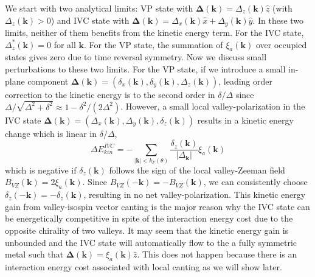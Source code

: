 \documentclass[aps,pra,twocolumn,superscriptaddress,10pt,article,nofootinbib,showpacs,longbibliography]{revtex4-1}
\def \k{{\mathbf k}}
\begin{document}
We start with two analytical limits: VP state with $\boldsymbol{\Delta}(\k) = \Delta_z(\k) \hat{z}$ (with $\Delta_z(\k)>0$) and IVC state with $\boldsymbol{\Delta}(\k) = \Delta_x(\k) \hat{x} + \Delta_y(\k) \hat{y}$. In these two limits, neither of them benefits from the kinetic energy term. For the IVC state, $\Delta^*_{z}(\k) = 0$ for all $\k$. For the VP state, the summation of $\xi_a(\k)$ over occupied states gives zero due to time reversal symmetry.
Now we discuss small perturbations to these two limits. For the VP state, if we introduce a small in-plane component $\boldsymbol{\Delta}(\k) = \left ( \delta_x(\k), \delta_y(\k), \Delta_z(\k)\right)$, leading order correction to the kinetic energy is to the second order in $\delta/\Delta$ since $\Delta/\sqrt{\Delta^2 + \delta^2} \approx 1 - \delta^2/(2 \Delta^2)$. However, a small local valley-polarization in the IVC state $\boldsymbol{\Delta}(\k) = \left ( \Delta_x(\k) , \Delta_y(\k),  \delta_z(\k) \right)$ results in a kinetic energy change which is linear in $\delta/\Delta$,
\begin{equation}
    \Delta E_{kin}^{IVC} = - \sum_{|\k|<k_F(\theta)} \frac{\delta_z(\k)}{|\Delta_{\k}|} \xi_a(\k)
\end{equation}
which is negative if $\delta_z(\k)$ follows the sign of the local valley-Zeeman field $B_{VZ}(\k) = 2 \xi_a(\k)$. 
Since $B_{VZ}(-\k) = - B_{VZ}(\k)$, we can consistently choose $\delta_z(-\k) = - \delta_z(\k)$, resulting in no net valley-polarization.
This kinetic energy gain from valley-isospin vector canting is the major reason why the IVC state can be energetically competitive in spite of the interaction energy cost due to the opposite chirality of two valleys. It may seem that the kinetic energy gain is unbounded and the IVC state will automatically flow to the a fully symmetric metal such that $\mathbf{\Delta}(\k) = \xi_a(\k) \hat{z}$. This does not happen because there is an interaction energy cost associated with local canting as we will show later.
\end{document}
